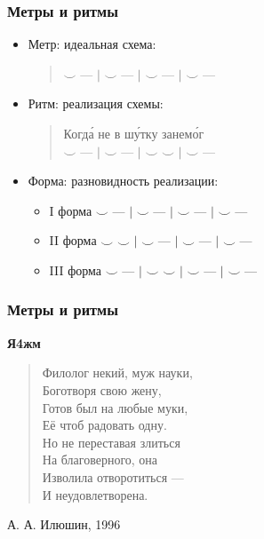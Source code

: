 \documentclass{beamer}
\begin{document}



\begin{frame}
\frametitle{Метры и ритмы}

\begin{itemize}
\item Метр: идеальная схема: \\
\begin{verse}
$\smile$ --- $\mid$ $\smile$ --- $\mid$ $\smile$ --- $\mid$ $\smile$ ---
\end{verse}
\item Ритм: реализация схемы:\\
\begin{verse}
 Когд\'{а} не в ш\'{у}тку занем\'{о}г\\
 $\smile$ --- $\mid$ $\smile$ --- $\mid$ $\smile$ $\smile$ $\mid$ $\smile$ ---
\end{verse}
\item Форма: разновидность реализации:
\begin{itemize}
\item I форма $\smile$ --- $\mid$ $\smile$ --- $\mid$ $\smile$ --- $\mid$ $\smile$ ---
\item II форма $\smile$ $\smile$ $\mid$ $\smile$ --- $\mid$ $\smile$ --- $\mid$ $\smile$ ---
\item III форма $\smile$ --- $\mid$ $\smile$ $\smile$ $\mid$ $\smile$ --- $\mid$ $\smile$ ---
\end{itemize}
\end{itemize}


\end{frame}


\begin{frame}
\frametitle{Метры и ритмы}

\textbf{Я4жм}
\begin{verse}
Филолог некий, муж науки,\\
Боготворя свою жену,\\
Готов был на любые муки,\\
Её чтоб радовать одну.\\
Но не переставая злиться\\
На благоверного, она\\
Изволила отворотиться —\\
И неудовлетворена.
\end{verse}

А. А. Илюшин, 1996

\end{frame}
\end{document}
